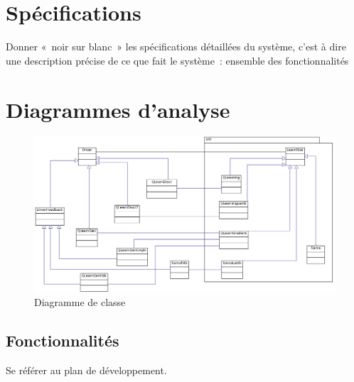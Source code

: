 \documentclass[a4paper,12pt]{article}
\begin{document}
  \begin{titlepage}
   \def\titletype{Analyse et conception}
   
  \end{titlepage}

  
  \clearpage

  \tableofcontents
  

  \clearpage
  
  \renewcommand{\labelitemi}{$\bullet$}
  \renewcommand{\labelitemii}{$\circ$}
  \renewcommand{\labelitemiii}{$\diamond$}
  \renewcommand{\labelitemiv}{$\ast$}
  
  \section{Spécifications}
  Donner « noir sur blanc » les spécifications détaillées du système, 
  c’est à dire une description précise de ce que fait le système : ensemble des fonctionnalités

 
 
 
 \section{Diagrammes d’analyse}

    \begin{figure}[H]
      \begin{center}
	\includegraphics[width=450px]{Diagrammedeclasses}
	\caption{ Diagramme de classe }
	\end{center}
    \end{figure}
 
    \subsection{Fonctionnalités}
    Se référer au plan de développement.
  
\end{document}
